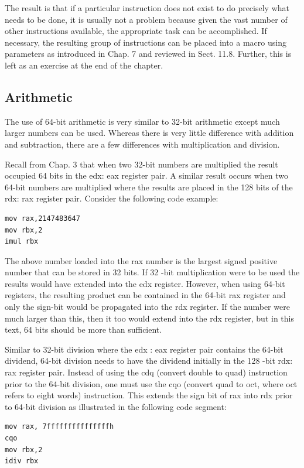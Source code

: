 \documentclass[10pt]{book}
\begin{document}
The result is that if a particular instruction does not exist to do precisely what needs to be done, it is usually not a problem because given the vast number of other instructions available, the appropriate task can be accomplished. If necessary, the resulting group of instructions can be placed into a macro using parameters as introduced in Chap. 7 and reviewed in Sect. 11.8. Further, this is left as an exercise at the end of the chapter.

\subsection{Arithmetic}
The use of 64-bit arithmetic is very similar to 32-bit arithmetic except much larger numbers can be used. Whereas there is very little difference with addition and subtraction, there are a few differences with multiplication and division.

Recall from Chap. 3 that when two 32-bit numbers are multiplied the result occupied 64 bits in the edx: eax register pair. A similar result occurs when two 64-bit numbers are multiplied where the results are placed in the 128 bits of the rdx: rax register pair. Consider the following code example:

\begin{verbatim}
mov rax,2147483647
mov rbx,2
imul rbx
\end{verbatim}

The above number loaded into the rax number is the largest signed positive number that can be stored in 32 bits. If 32 -bit multiplication were to be used the results would have extended into the edx register. However, when using 64-bit registers, the resulting product can be contained in the 64-bit rax register and only the sign-bit would be propagated into the rdx register. If the number were much larger than this, then it too would extend into the rdx register, but in this text, 64 bits should be more than sufficient.

Similar to 32-bit division where the edx : eax register pair contains the 64-bit dividend, 64-bit division needs to have the dividend initially in the 128 -bit rdx:\\
rax register pair. Instead of using the cdq (convert double to quad) instruction prior to the 64-bit division, one must use the cqo (convert quad to oct, where oct refers to eight words) instruction. This extends the sign bit of rax into rdx prior to 64-bit division as illustrated in the following code segment:
\begin{verbatim}
mov rax, 7fffffffffffffffh
cqo
mov rbx,2
idiv rbx
\end{verbatim}
\end{document}
